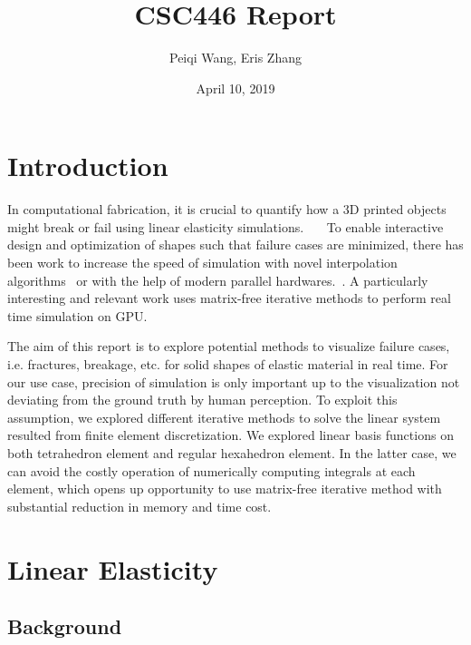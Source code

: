 \documentclass[11pt,titlepage]{article}
\title{CSC446 Report}
\author{Peiqi Wang, Eris Zhang}
\date{April 10, 2019}
\begin{document}
\maketitle
\tableofcontents

\newpage
\section{Introduction}

In computational fabrication, it is crucial to quantify how a 3D printed objects might break or fail using linear elasticity simulations.~\cite{zhou_panetta_zorin_2013}~\cite{langlois_shamir_dror_matusik_levin_2016}~\cite{langlois_shamir_dror_matusik_levin_2016} To enable interactive design and optimization of shapes such that failure cases are minimized, there has been work to increase the speed of simulation with novel interpolation algorithms~\cite{schulz_xu_zhu_zheng_grinspun_matusik_2017} or with the help of modern parallel hardwares.~\cite{dick_georgii_westermann_2011}. A particularly interesting and relevant work uses matrix-free iterative methods to perform real time simulation on GPU.~\cite{yadav_suresh_2014}~\cite{marix_free_voxel_fem_thesis_2018}


 
The aim of this report is to explore potential methods to visualize failure cases, i.e. fractures, breakage, etc. for solid shapes of elastic material in real time. For our use case, precision of simulation is only important up to the visualization not deviating from the ground truth by human perception. To exploit this assumption, we explored different iterative methods to solve the linear system resulted from finite element discretization. We explored linear basis functions on both tetrahedron element and regular hexahedron element. In the latter case, we can avoid the costly operation of numerically computing integrals at each element, which opens up opportunity to use matrix-free iterative method with substantial reduction in memory and time cost.


\section{Linear Elasticity}

\subsection{Background}
\end{document}
